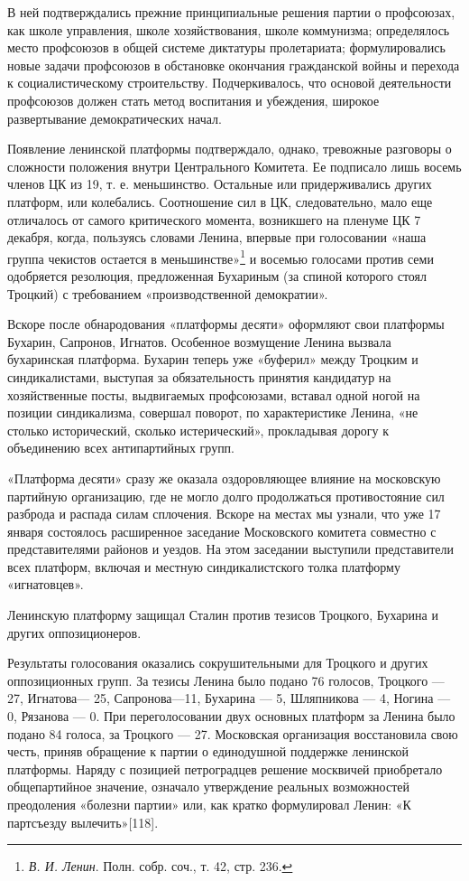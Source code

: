 \documentclass[12pt, a4paper, openany]{book}
\begin{document}
В ней подтверждались прежние принципиальные решения партии о профсоюзах, как школе управления, школе хозяйствования, школе коммунизма; определялось место профсоюзов в общей системе диктатуры пролетариата; формулировались новые задачи профсоюзов в обстановке окончания гражданской войны и перехода к социалистическому строительству. Подчеркивалось, что основой деятельности профсоюзов должен стать метод воспитания и убеждения, широкое развертывание демократических начал.

Появление ленинской платформы подтверждало, однако, тревожные разговоры о сложности положения внутри Центрального Комитета. Ее подписало лишь восемь членов ЦК из 19, т. е. меньшинство. Остальные или придерживались других платформ, или колебались. Соотношение сил в ЦК, следовательно, мало еще отличалось от самого критического момента, возникшего на пленуме ЦК 7 декабря, когда, пользуясь словами Ленина, впервые при голосовании «наша группа чекистов остается в меньшинстве»\footnote{\textit{В. И. Ленин}. Полн. собр. соч., т. 42, стр. 236.} и восемью голосами против семи одобряется резолюция, предложенная Бухариным (за спиной которого стоял Троцкий) с требованием «производственной демократии».

Вскоре после обнародования «платформы десяти» оформляют свои платформы Бухарин, Сапронов, Игнатов. Особенное возмущение Ленина вызвала бухаринская платформа. Бухарин теперь уже «буферил» между Троцким и синдикалистами, выступая за обязательность принятия кандидатур на хозяйственные посты, выдвигаемых профсоюзами, вставал одной ногой на позиции синдикализма, совершал поворот, по характеристике Ленина, «не столько исторический, сколько истерический», прокладывая дорогу к объединению всех антипартийных групп.

«Платформа десяти» сразу же оказала оздоровляющее влияние на московскую партийную организацию, где не могло долго продолжаться противостояние сил разброда и распада силам сплочения. Вскоре на местах мы узнали, что уже 17 января состоялось расширенное заседание Московского комитета совместно с представителями районов и уездов. На этом заседании выступили представители всех платформ, включая и местную синдикалистского толка платформу «игнатовцев».

Ленинскую платформу защищал Сталин против тезисов Троцкого, Бухарина и других оппозиционеров.

Результаты голосования оказались сокрушительными для Троцкого и других оппозиционных групп. За тезисы Ленина было подано 76 голосов, Троцкого — 27, Игнатова— 25, Сапронова—11, Бухарина — 5, Шляпникова — 4, Ногина — 0, Рязанова — 0. При переголосовании двух основных платформ за Ленина было подано 84 голоса, за Троцкого — 27. Московская организация восстановила свою честь, приняв обращение к партии о единодушной поддержке ленинской платформы. Наряду с позицией петроградцев решение москвичей приобретало общепартийное значение, означало утверждение реальных возможностей преодоления «болезни партии» или, как кратко формулировал Ленин: «К партсъезду вылечить»[118].
\end{document}
